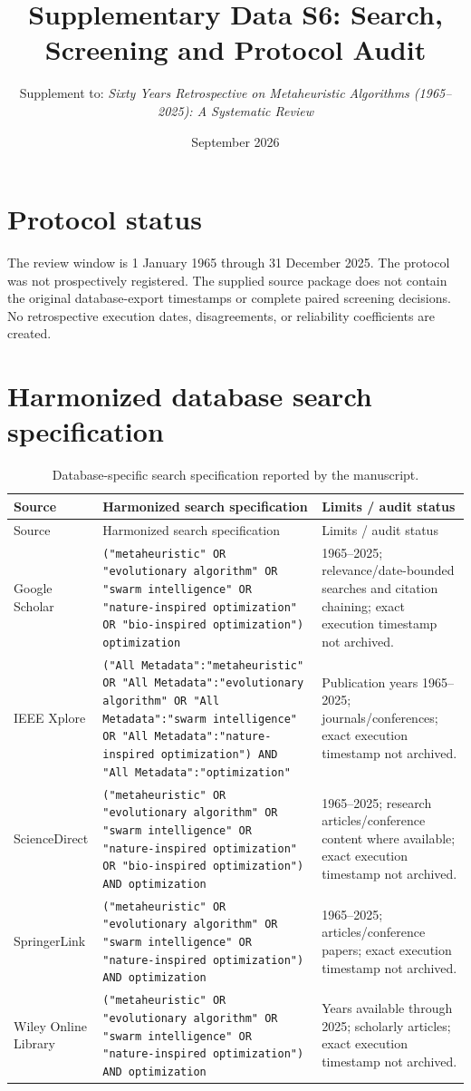 \documentclass[9pt]{article}
\title{Supplementary Data S6: Search, Screening and Protocol Audit}
\author{Supplement to: \textit{Sixty Years Retrospective on Metaheuristic Algorithms (1965--2025): A Systematic Review}}
\date{September 2026}
\begin{document}
\maketitle
\section*{Protocol status}
The review window is 1 January 1965 through 31 December 2025. The protocol was not prospectively registered. The supplied source package does not contain the original database-export timestamps or complete paired screening decisions. No retrospective execution dates, disagreements, or reliability coefficients are created.

\section*{Harmonized database search specification}
\small
\begin{longtable}{P{2.7cm}P{9.2cm}P{3.3cm}}
\caption{Database-specific search specification reported by the manuscript.}\\
\toprule
Source & Harmonized search specification & Limits / audit status\\
\midrule\endfirsthead
\toprule Source & Harmonized search specification & Limits / audit status\\\midrule\endhead
Google Scholar & \texttt{("metaheuristic" OR "evolutionary algorithm" OR "swarm intelligence" OR "nature-inspired optimization" OR "bio-inspired optimization") optimization} & 1965--2025; relevance/date-bounded searches and citation chaining; exact execution timestamp not archived.\\
IEEE Xplore & \texttt{("All Metadata":"metaheuristic" OR "All Metadata":"evolutionary algorithm" OR "All Metadata":"swarm intelligence" OR "All Metadata":"nature-inspired optimization") AND "All Metadata":"optimization"} & Publication years 1965--2025; journals/conferences; exact execution timestamp not archived.\\
ScienceDirect & \texttt{("metaheuristic" OR "evolutionary algorithm" OR "swarm intelligence" OR "nature-inspired optimization" OR "bio-inspired optimization") AND optimization} & 1965--2025; research articles/conference content where available; exact execution timestamp not archived.\\
SpringerLink & \texttt{("metaheuristic" OR "evolutionary algorithm" OR "swarm intelligence" OR "nature-inspired optimization") AND optimization} & 1965--2025; articles/conference papers; exact execution timestamp not archived.\\
Wiley Online Library & \texttt{("metaheuristic" OR "evolutionary algorithm" OR "swarm intelligence" OR "nature-inspired optimization") AND optimization} & Years available through 2025; scholarly articles; exact execution timestamp not archived.\\
\bottomrule\end{longtable}
\end{document}
